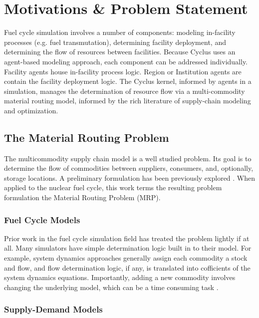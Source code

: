 \section{Motivations \& Problem Statement}

Fuel cycle simulation involves a number of components: modeling in-facility
processes (e.g. fuel transmutation), determining facility deployment, and
determining the flow of resources between facilities. Because Cyclus uses an
agent-based modeling approach, each component can be addressed
individually. Facility agents house in-facility process logic. Region or
Institution agents are contain the facility deployment logic. The Cyclus kernel,
informed by agents in a simulation, manages the determination of resource flow
via a multi-commodity material routing model, informed by the rich literature of
supply-chain modeling and optimization.

\subsection{The Material Routing Problem}

The multicommodity supply chain model is a well studied problem. Its goal is to
determine the flow of commodities between suppliers, consumers, and, optionally,
storage locations. A preliminary formulation has been previously explored
\cite{gidden_agent-based_2013}. When applied to the nuclear fuel cycle, this
work terms the resulting problem formulation the Material Routing Problem (MRP).

\subsubsection{Fuel Cycle Models}

Prior work in the fuel cycle simulation field has treated the problem lightly if
at all. Many simulators have simple determination logic built in to their
model. For example, system dynamics approaches generally assign each commodity a
stock and flow, and flow determination logic, if any, is translated into
cofficients of the system dynamics equations. Importantly, adding a new
commodity involves changing the underlying model, which can be a time consuming
task \cite{guerin_impact_2009}.

\subsubsection{Supply-Demand Models}

